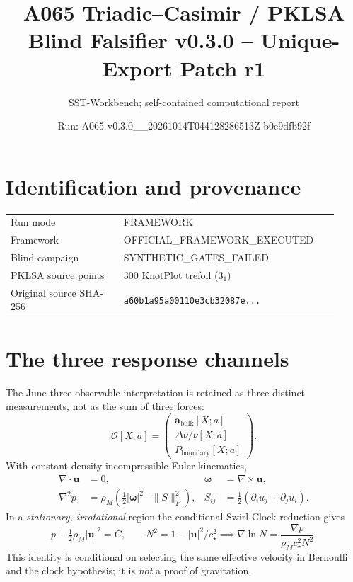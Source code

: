 \documentclass[10pt,a4paper]{article}
\title{A065 Triadic--Casimir / PKLSA\\ Blind Falsifier v0.3.0 -- Unique-Export Patch r1}
\author{SST-Workbench; self-contained computational report}
\date{Run: A065-v0.3.0\_\_20261014T044128286513Z-b0e9dfb92f}
\begin{document}
\maketitle
\begin{center}
\end{center}
\section{Identification and provenance}
\begin{tabular}{@{}p{0.32\linewidth}p{0.60\linewidth}@{}}
\toprule
Run mode & FRAMEWORK \\
Framework & OFFICIAL\_FRAMEWORK\_EXECUTED \\
Blind campaign & SYNTHETIC\_GATES\_FAILED \\
PKLSA source points & 300 KnotPlot trefoil ($3_1$) \\
Original source SHA-256 & \texttt{a60b1a95a00110e3cb32087e...} \\
\bottomrule
\end{tabular}
\section{The three response channels}
The June three-observable interpretation is retained as three distinct measurements, not as the sum of three forces:
\[
\mathcal O[X;a]=\begin{pmatrix}
\mathbf a_{\mathrm{bulk}}[X;a]\\
\Delta\nu/\nu[X;a]\\
P_{\mathrm{boundary}}[X;a]
\end{pmatrix}.
\]
With constant-density incompressible Euler kinematics,
\begin{align}
\nabla\cdot\mathbf u&=0,&
\boldsymbol\omega&=\nabla\times\mathbf u,\\
\nabla^2p&=\rho_M\left(\tfrac12|\boldsymbol\omega|^2-\|S\|_F^2\right),&
S_{ij}&=\tfrac12(\partial_i u_j+\partial_j u_i).
\end{align}
In a \emph{stationary, irrotational} region the conditional Swirl-Clock reduction gives
\[
p+\tfrac12\rho_M|\mathbf u|^2=C,\qquad
N^2=1-|\mathbf u|^2/c_\star^2
\implies\nabla\ln N=\frac{\nabla p}{\rho_Mc_\star^2N^2}.
\]
This identity is conditional on selecting the same effective velocity in Bernoulli and the clock hypothesis; it is \emph{not} a proof of gravitation.
\end{document}

